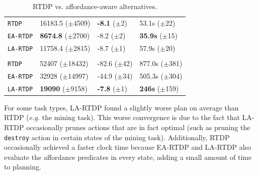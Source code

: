 \documentclass[letterpaper]{article}
\newcommand{\stnote}[1]{\textcolor{Blue}{\textbf{stefie10: #1}}}
\begin{document}
\begin{table}[t]
\begin{tabular}{@{}llll@{}}
\texttt{RTDP}  	& 16183.5 ($\pm$4509) 		& {\bf -8.1}   ($\pm$2) & 53.1s   ($\pm$22) \\
\texttt{EA-RTDP} 	& {\bf 8674.8} 	($\pm$2700) 	& -8.2   ($\pm$2) & {\bf 35.9s}   ($\pm$15) \\ 
\texttt{LA-RTDP} 	& 11758.4 ($\pm$2815) 		& -8.7   ($\pm$1) & 57.9s   ($\pm$20) \\ \hline
&\hspace{-10mm}{\it Plane Traversal Task} \\
\texttt{RTDP} & 52407 ($\pm$18432) 		& -82.6   ($\pm$42) & 877.0s   ($\pm$381) \\
\texttt{EA-RTDP} 	& 32928 ($\pm$14997) 		& -44.9   ($\pm$34) & 505.3s   ($\pm$304) \\
\texttt{LA-RTDP} 	& {\bf 19090} 	 ($\pm$9158) 	& {\bf-7.8}   ($\pm$1) & {\bf 246s}  ($\pm$159) \\
\bottomrule
\end{tabular}
\caption{RTDP vs. affordance-aware alternatives.}
\label{table:minecraft_results}
\end{table}


For some task types, LA-RTDP found a slightly worse plan on average than
RTDP ({\em e.g.} the mining task). This worse convergence is due to the fact that LA-RTDP
occasionally prunes actions that are in fact optimal (such as
pruning the \texttt{destroy} action in certain states of the mining task).
Additionally, RTDP occasionally achieved a faster clock time because EA-RTDP and LA-RTDP also evaluate the affordance predicates in every state, adding a small amount of time to planning.

\end{document}
